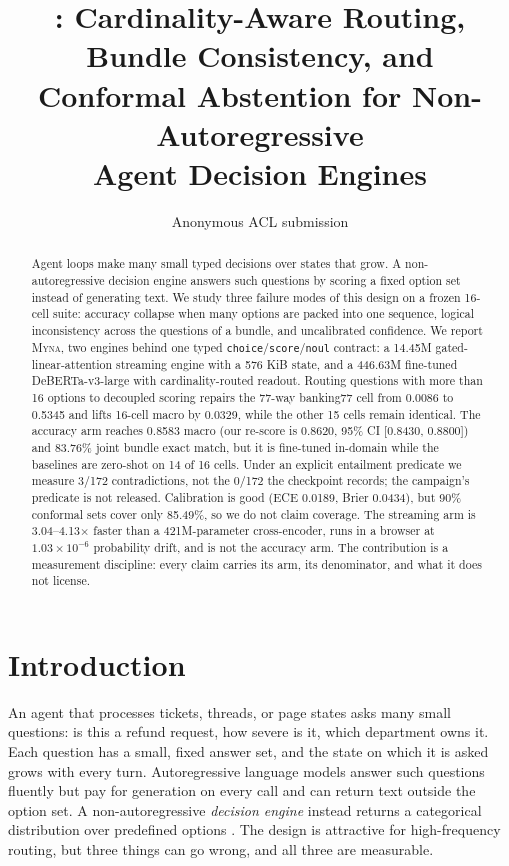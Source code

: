 \documentclass[11pt]{article}
\title{\myna: Cardinality-Aware Routing, Bundle Consistency, and\\Conformal Abstention for Non-Autoregressive\\Agent Decision Engines}
\author{Anonymous ACL submission}
\date{}
\newcommand{\myna}{\textsc{Myna}}
\begin{document}
\maketitle

\begin{abstract}
Agent loops make many small typed decisions over states that grow. A non-autoregressive decision engine answers such questions by scoring a fixed option set instead of generating text. We study three failure modes of this design on a frozen 16-cell suite: accuracy collapse when many options are packed into one sequence, logical inconsistency across the questions of a bundle, and uncalibrated confidence. We report \myna, two engines behind one typed \texttt{choice}/\texttt{score}/\texttt{noul} contract: a 14.45M gated-linear-attention streaming engine with a 576 KiB state, and a 446.63M fine-tuned DeBERTa-v3-large with cardinality-routed readout. Routing questions with more than 16 options to decoupled scoring repairs the 77-way banking77 cell from 0.0086 to 0.5345 and lifts 16-cell macro by 0.0329, while the other 15 cells remain identical. The accuracy arm reaches 0.8583 macro (our re-score is 0.8620, 95\% CI [0.8430, 0.8800]) and 83.76\% joint bundle exact match, but it is fine-tuned in-domain while the baselines are zero-shot on 14 of 16 cells. Under an explicit entailment predicate we measure 3/172 contradictions, not the 0/172 the checkpoint records; the campaign's predicate is not released. Calibration is good (ECE 0.0189, Brier 0.0434), but 90\% conformal sets cover only 85.49\%, so we do not claim coverage. The streaming arm is 3.04--4.13$\times$ faster than a 421M-parameter cross-encoder, runs in a browser at $1.03\times10^{-6}$ probability drift, and is not the accuracy arm. The contribution is a measurement discipline: every claim carries its arm, its denominator, and what it does not license.
\end{abstract}

\section{Introduction}
\label{sec:intro}

An agent that processes tickets, threads, or page states asks many small questions: is this a refund request, how severe is it, which department owns it. Each question has a small, fixed answer set, and the state on which it is asked grows with every turn. Autoregressive language models answer such questions fluently but pay for generation on every call and can return text outside the option set. A non-autoregressive \emph{decision engine} instead returns a categorical distribution over predefined options \citep{li2026jev,duan2026gdm}. The design is attractive for high-frequency routing, but three things can go wrong, and all three are measurable.
\end{document}
